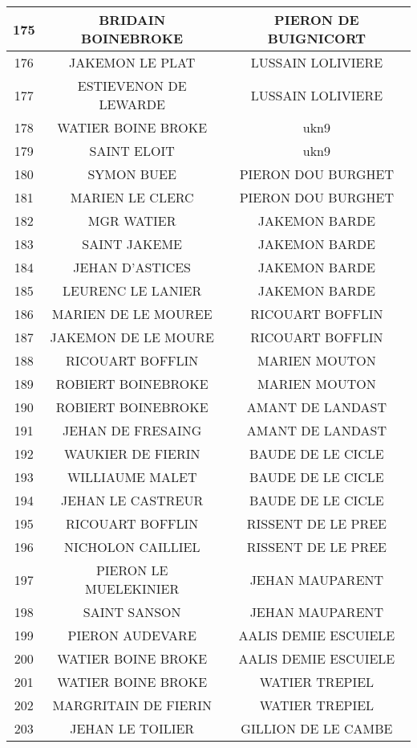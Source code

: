 \begin{center}
\begin{longtable}{|c|c|c|}
\hline	175	&	BRIDAIN BOINEBROKE	&	PIERON DE BUIGNICORT	\\
\hline	176	&	JAKEMON LE PLAT	&	LUSSAIN LOLIVIERE	\\
\hline	177	&	ESTIEVENON DE LEWARDE	&	LUSSAIN LOLIVIERE	\\
\hline	178	&	WATIER BOINE BROKE	&	ukn9	\\
\hline	179	&	SAINT ELOIT	&	ukn9	\\
\hline	180	&	SYMON BUEE	&	PIERON DOU BURGHET	\\
\hline	181	&	MARIEN LE CLERC	&	PIERON DOU BURGHET	\\
\hline	182	&	MGR WATIER	&	JAKEMON BARDE	\\
\hline	183	&	SAINT JAKEME	&	JAKEMON BARDE	\\
\hline	184	&	JEHAN D'ASTICES	&	JAKEMON BARDE	\\
\hline	185	&	LEURENC LE LANIER	&	JAKEMON BARDE	\\
\hline	186	&	MARIEN DE LE MOUREE	&	RICOUART BOFFLIN	\\
\hline	187	&	JAKEMON DE LE MOURE	&	RICOUART BOFFLIN	\\
\hline	188	&	RICOUART BOFFLIN	&	MARIEN MOUTON	\\
\hline	189	&	ROBIERT BOINEBROKE	&	MARIEN MOUTON	\\
\hline	190	&	ROBIERT BOINEBROKE	&	AMANT DE LANDAST	\\
\hline	191	&	JEHAN DE FRESAING	&	AMANT DE LANDAST	\\
\hline	192	&	WAUKIER DE FIERIN	&	BAUDE DE LE CICLE	\\
\hline	193	&	WILLIAUME MALET	&	BAUDE DE LE CICLE	\\
\hline	194	&	JEHAN LE CASTREUR	&	BAUDE DE LE CICLE	\\
\hline	195	&	RICOUART BOFFLIN	&	RISSENT DE LE PREE	\\
\hline	196	&	NICHOLON CAILLIEL	&	RISSENT DE LE PREE	\\
\hline	197	&	PIERON LE MUELEKINIER	&	JEHAN MAUPARENT	\\
\hline	198	&	SAINT SANSON	&	JEHAN MAUPARENT	\\
\hline	199	&	PIERON AUDEVARE	&	AALIS DEMIE ESCUIELE	\\
\hline	200	&	WATIER BOINE BROKE	&	AALIS DEMIE ESCUIELE	\\
\hline	201	&	WATIER BOINE BROKE	&	WATIER TREPIEL	\\
\hline	202	&	MARGRITAIN DE FIERIN	&	WATIER TREPIEL	\\
\hline	203	&	JEHAN LE TOILIER	&	GILLION DE LE CAMBE	\\

\end{longtable}
\end{center}
